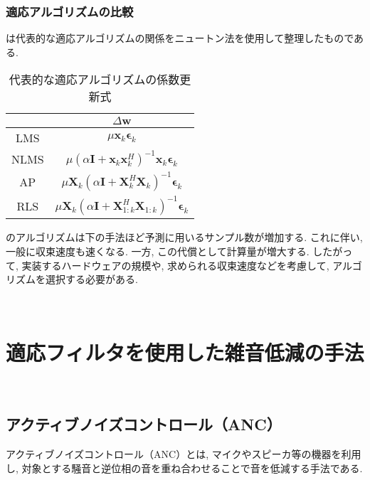 \subsubsection{適応アルゴリズムの比較}\label{algo-compare}

は代表的な適応アルゴリズムの関係をニュートン法を使用して整理したものである. 

\begin{table}[H]
  \centering
  \caption{代表的な適応アルゴリズムの係数更新式}
  \label{tab:formula}
  \begin{tabular}{|c|c|}
  \hline
       & \(\Delta \bm{w}\)                                                                                             \\ \hline
  LMS  & \( \mu \bm{x}_k \bm{\epsilon}_k \)                                                                         \\ \hline
  NLMS & \( \mu \left( \alpha \bm{I} + \bm{x}_k \bm{x}_k^H \right)^{-1} \bm{x}_k \bm{\epsilon}_k \)        \\ \hline
  AP   & \(\mu \bm{X}_k \left( \alpha \bm{I} + \bm{X}_k^H \bm{X}_k \right)^{-1} \bm{\epsilon}_k\)          \\ \hline
  RLS  & \( \mu \bm{X}_k \left( \alpha \bm{I} + \bm{X}_{1:k}^H \bm{X}_{1:k} \right)^{-1} \bm{\epsilon}_k\) \\ \hline
  \end{tabular}
\end{table}

のアルゴリズムは下の手法ほど予測に用いるサンプル数が増加する. これに伴い, 一般に収束速度も速くなる. 一方, この代償として計算量が増大する. したがって, 実装するハードウェアの規模や, 求められる収束速度などを考慮して, アルゴリズムを選択する必要がある. 

\
\section{適応フィルタを使用した雑音低減の手法}\label{adf-noise-reduction}

\
\subsection{アクティブノイズコントロール（ANC）}\label{anc}

アクティブノイズコントロール（ANC）とは, マイクやスピーカ等の機器を利用し, 対象とする騒音と逆位相の音を重ね合わせることで音を低減する手法である. 

